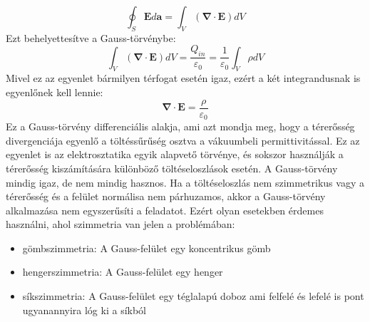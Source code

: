 \documentclass[../main.tex]{subfiles}
\begin{document}
\begin{equation}
    \oint_S \mathbf{E} d\mathbf{a} = \int_V (\boldsymbol{\nabla} \cdot \mathbf{E}) dV
\end{equation}
Ezt behelyettesítve a Gauss-törvénybe:
\begin{equation}
    \int_V (\boldsymbol{\nabla} \cdot \mathbf{E}) dV = \frac{{Q_{in}}}{\varepsilon_0} = \frac{1}{\varepsilon_0} \int_V \rho dV
\end{equation}
Mivel ez az egyenlet bármilyen térfogat esetén igaz, ezért a két integrandusnak is egyenlőnek kell lennie:
\begin{equation}
    \boxed{\boldsymbol{\nabla} \cdot \mathbf{E} = \frac{\rho}{\varepsilon_0}}
\end{equation}
Ez a Gauss-törvény differenciális alakja, ami azt mondja meg, hogy a térerősség divergenciája egyenlő a töltéssűrűség osztva a vákuumbeli permittivitással. Ez az egyenlet is az elektrosztatika egyik alapvető törvénye, és sokszor használják a térerősség kiszámítására különböző töltéseloszlások esetén.
\newline
\newline
A Gauss-törvény mindig igaz, de nem mindig hasznos. Ha a töltéseloszlás nem szimmetrikus vagy a térerősség és a felület normálisa nem párhuzamos, akkor a Gauss-törvény alkalmazása nem egyszerűsíti a feladatot. Ezért olyan esetekben érdemes használni, ahol szimmetria van jelen a problémában:
\begin{itemize}
    \item gömbszimmetria: A Gauss-felület egy koncentrikus gömb
    \item hengerszimmetria: A Gauss-felület egy henger
    \item síkszimmetria: A Gauss-felület egy téglalapú doboz ami felfelé és lefelé is pont ugyanannyira lóg ki a síkból
\end{itemize}
\end{document}
